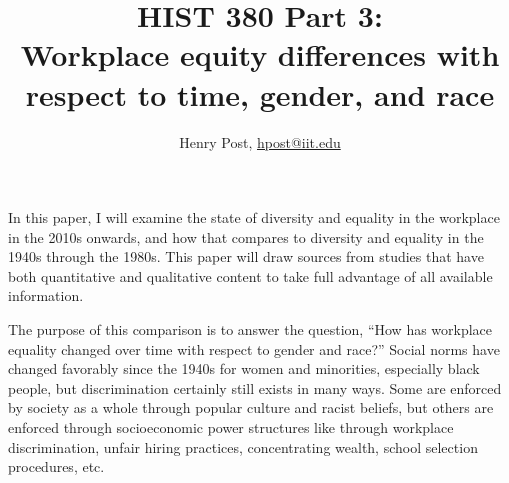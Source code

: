 \documentclass[a4paper,12pt]{article}
\title{HIST 380 Part 3: \\ Workplace equity differences with \\ respect to time, gender, and race }
\author{Henry Post, \url{hpost@iit.edu}}
\begin{document}
\maketitle

\newpage
\doublespacing


	In this paper, I will examine the state of diversity and equality in the workplace in the 2010s onwards, and how that compares to diversity and equality in the 1940s through the 1980s. 
This paper will draw sources %
from studies that have both quantitative and qualitative content to take full advantage of all available information.

	The purpose of this comparison is to answer the question, ``How has workplace equality changed over time with respect to gender and race?'' Social norms have changed favorably since the 1940s for women and minorities, especially black people, but discrimination certainly still exists in many ways. Some are enforced by society as a whole through popular culture and racist beliefs, but others are enforced through socioeconomic power structures like through workplace discrimination, unfair hiring practices, concentrating wealth, school selection procedures, etc.







\end{document}
